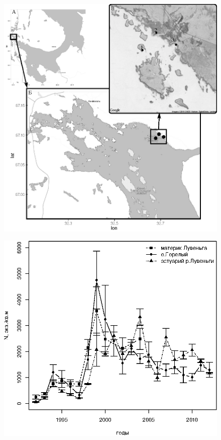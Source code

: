 \documentclass[12pt, a4paper]{article}
\begin{document}
	\begin{figure}[ht]
		\includegraphics[height=0.45\textheight]{Nazarova_fig1.eps}	
	\end{figure}

	\begin{figure}[ht]
		\includegraphics[height=0.45\textheight]{Nazarova_fig2.eps}	
	\end{figure}
\end{document}
